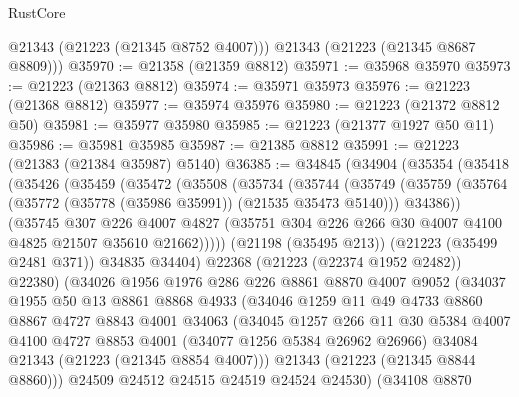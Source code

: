 \begin{lexlean}{RustCore}
\begin{coremodule}
        @21343
        (@21223 (@21345 @8752 @4007)))
      @21343
      (@21223 (@21345 @8687 @8809)))
@35970 := @21358 (@21359 @8812)
@35971 := @35968 @35970
@35973 := @21223 (@21363 @8812)
@35974 := @35971 @35973
@35976 := @21223 (@21368 @8812)
@35977 := @35974 @35976
@35980 := @21223 (@21372 @8812 @50)
@35981 := @35977 @35980
@35985 := @21223 (@21377 @1927 @50 @11)
@35986 := @35981 @35985
@35987 := @21385 @8812
@35991 := @21223 (@21383 (@21384 @35987) @5140)
@36385 := @34845
    (@34904
      (@35354
        (@35418
          (@35426
            (@35459
              (@35472
                (@35508
                  (@35734
                    (@35744
                      (@35749
                        (@35759
                          (@35764 (@35772 (@35778 (@35986 @35991)) (@21535 @35473 @5140)))
                          @34386))
                      (@35745
                        @307
                        @226
                        @4007
                        @4827
                        (@35751 @304 @226 @266 @30 @4007 @4100 @4825 @21507 @35610 @21662)))))
                (@21198 (@35495 @213))
                (@21223 (@35499 @2481 @371))
                @34835
                @34404)
              @22368
              (@21223 (@22374 @1952 @2482))
              @22380)
            (@34026
              @1956
              @1976
              @286
              @226
              @8861
              @8870
              @4007
              @9052
              (@34037
                @1955
                @50
                @13
                @8861
                @8868
                @4933
                (@34046
                  @1259
                  @11
                  @49
                  @4733
                  @8860
                  @8867
                  @4727
                  @8843
                  @4001
                  @34063
                  (@34045
                    @1257
                    @266
                    @11
                    @30
                    @5384
                    @4007
                    @4100
                    @4727
                    @8853
                    @4001
                    (@34077 @1256 @5384 @26962 @26966)
                    @34084
                    @21343
                    (@21223 (@21345 @8854 @4007)))
                  @21343
                  (@21223 (@21345 @8844 @8860)))
                @24509
                @24512
                @24515
                @24519
                @24524
                @24530)
              (@34108
                @8870

\end{coremodule}
\end{lexlean}
